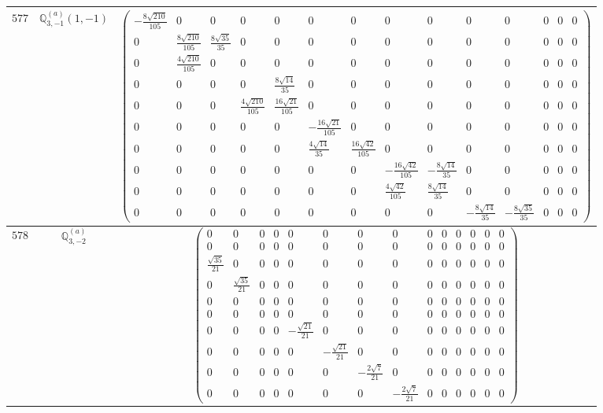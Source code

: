 \documentclass[fleqn,8pt,landscape]{jsarticle}
\begin{document}
\begin{center}
\begin{longtable}{ccc}
$ 577 $ & $ \mathbb{Q}_{3,-1}^{(a)}(1,-1) $ & $ \begin{pmatrix} - \frac{8 \sqrt{210}}{105} & 0 & 0 & 0 & 0 & 0 & 0 & 0 & 0 & 0 & 0 & 0 & 0 & 0 \\ 0 & \frac{8 \sqrt{210}}{105} & \frac{8 \sqrt{35}}{35} & 0 & 0 & 0 & 0 & 0 & 0 & 0 & 0 & 0 & 0 & 0 \\ 0 & \frac{4 \sqrt{210}}{105} & 0 & 0 & 0 & 0 & 0 & 0 & 0 & 0 & 0 & 0 & 0 & 0 \\ 0 & 0 & 0 & 0 & \frac{8 \sqrt{14}}{35} & 0 & 0 & 0 & 0 & 0 & 0 & 0 & 0 & 0 \\ 0 & 0 & 0 & \frac{4 \sqrt{210}}{105} & \frac{16 \sqrt{21}}{105} & 0 & 0 & 0 & 0 & 0 & 0 & 0 & 0 & 0 \\ 0 & 0 & 0 & 0 & 0 & - \frac{16 \sqrt{21}}{105} & 0 & 0 & 0 & 0 & 0 & 0 & 0 & 0 \\ 0 & 0 & 0 & 0 & 0 & \frac{4 \sqrt{14}}{35} & \frac{16 \sqrt{42}}{105} & 0 & 0 & 0 & 0 & 0 & 0 & 0 \\ 0 & 0 & 0 & 0 & 0 & 0 & 0 & - \frac{16 \sqrt{42}}{105} & - \frac{8 \sqrt{14}}{35} & 0 & 0 & 0 & 0 & 0 \\ 0 & 0 & 0 & 0 & 0 & 0 & 0 & \frac{4 \sqrt{42}}{105} & \frac{8 \sqrt{14}}{35} & 0 & 0 & 0 & 0 & 0 \\ 0 & 0 & 0 & 0 & 0 & 0 & 0 & 0 & 0 & - \frac{8 \sqrt{14}}{35} & - \frac{8 \sqrt{35}}{35} & 0 & 0 & 0 \end{pmatrix} $ \\ \hline
$ 578 $ & $ \mathbb{Q}_{3,-2}^{(a)} $ & $ \begin{pmatrix} 0 & 0 & 0 & 0 & 0 & 0 & 0 & 0 & 0 & 0 & 0 & 0 & 0 & 0 \\ 0 & 0 & 0 & 0 & 0 & 0 & 0 & 0 & 0 & 0 & 0 & 0 & 0 & 0 \\ \frac{\sqrt{35}}{21} & 0 & 0 & 0 & 0 & 0 & 0 & 0 & 0 & 0 & 0 & 0 & 0 & 0 \\ 0 & \frac{\sqrt{35}}{21} & 0 & 0 & 0 & 0 & 0 & 0 & 0 & 0 & 0 & 0 & 0 & 0 \\ 0 & 0 & 0 & 0 & 0 & 0 & 0 & 0 & 0 & 0 & 0 & 0 & 0 & 0 \\ 0 & 0 & 0 & 0 & 0 & 0 & 0 & 0 & 0 & 0 & 0 & 0 & 0 & 0 \\ 0 & 0 & 0 & 0 & - \frac{\sqrt{21}}{21} & 0 & 0 & 0 & 0 & 0 & 0 & 0 & 0 & 0 \\ 0 & 0 & 0 & 0 & 0 & - \frac{\sqrt{21}}{21} & 0 & 0 & 0 & 0 & 0 & 0 & 0 & 0 \\ 0 & 0 & 0 & 0 & 0 & 0 & - \frac{2 \sqrt{7}}{21} & 0 & 0 & 0 & 0 & 0 & 0 & 0 \\ 0 & 0 & 0 & 0 & 0 & 0 & 0 & - \frac{2 \sqrt{7}}{21} & 0 & 0 & 0 & 0 & 0 & 0 \end{pmatrix} $ \\ \hline

\end{longtable}
\end{center}
\end{document}
